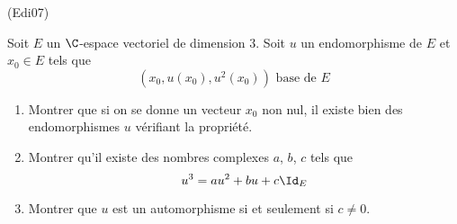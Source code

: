 \begin{tiny}(Edi07)\end{tiny} Soit $E$ un $\C$-espace vectoriel de dimension $3$. Soit $u$ un endomorphisme de $E$ et $x_0\in E$ tels que 
\begin{displaymath}
  (x_0,u(x_0),u^2(x_0))\text{ base de }E
\end{displaymath}
\begin{enumerate}
  \item Montrer que si on se donne un vecteur $x_0$ non nul, il existe bien des endomorphismes $u$ vérifiant la propriété.
  \item Montrer qu'il existe des nombres complexes $a$, $b$, $c$ tels que
\begin{displaymath}
  u^3 = au^2 + bu + c\Id_E
\end{displaymath}
\item Montrer que $u$ est un automorphisme si et seulement si $c\neq 0$.
\end{enumerate}

